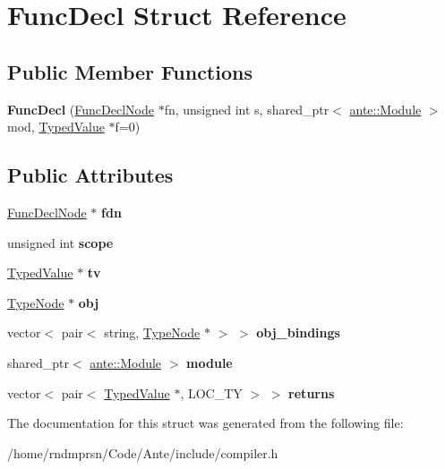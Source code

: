 \hypertarget{structFuncDecl}{}\section{Func\+Decl Struct Reference}
\label{structFuncDecl}
\subsection*{Public Member Functions}
\begin{DoxyCompactItemize}
\item 
\mbox{\label{structFuncDecl_a63d098d6ba48c96e1dffc92788e7aecc}} 
{\bfseries Func\+Decl} (\hyperlink{structFuncDeclNode}{Func\+Decl\+Node} $\ast$fn, unsigned int s, shared\+\_\+ptr$<$ \hyperlink{structante_1_1Module}{ante\+::\+Module} $>$ mod, \hyperlink{structTypedValue}{Typed\+Value} $\ast$f=0)
\end{DoxyCompactItemize}
\subsection*{Public Attributes}
\begin{DoxyCompactItemize}
\item 
\mbox{\label{structFuncDecl_a9ebb189f08fd2db2faaa0d2bbd45fe9c}} 
\hyperlink{structFuncDeclNode}{Func\+Decl\+Node} $\ast$ {\bfseries fdn}
\item 
\mbox{\label{structFuncDecl_ac1f4f9191059443c52e510d552935e73}} 
unsigned int {\bfseries scope}
\item 
\mbox{\label{structFuncDecl_a13a59ddf944d0e5ab5565654effa079a}} 
\hyperlink{structTypedValue}{Typed\+Value} $\ast$ {\bfseries tv}
\item 
\mbox{\label{structFuncDecl_a23792cc1d09bcc14df66fd7ab6665c40}} 
\hyperlink{structTypeNode}{Type\+Node} $\ast$ {\bfseries obj}
\item 
\mbox{\label{structFuncDecl_a16bf0d6e71bf686aa64801395a8ecbcf}} 
vector$<$ pair$<$ string, \hyperlink{structTypeNode}{Type\+Node} $\ast$ $>$ $>$ {\bfseries obj\+\_\+bindings}
\item 
\mbox{\label{structFuncDecl_ad87f5bc014c80fa79b000158c9423aee}} 
shared\+\_\+ptr$<$ \hyperlink{structante_1_1Module}{ante\+::\+Module} $>$ {\bfseries module}
\item 
\mbox{\label{structFuncDecl_af5c8ee2b8c09b793d99b5f291a88e978}} 
vector$<$ pair$<$ \hyperlink{structTypedValue}{Typed\+Value} $\ast$, L\+O\+C\+\_\+\+TY $>$ $>$ {\bfseries returns}
\end{DoxyCompactItemize}


The documentation for this struct was generated from the following file\+:\begin{DoxyCompactItemize}
\item 
/home/rndmprsn/\+Code/\+Ante/include/compiler.\+h\end{DoxyCompactItemize}
